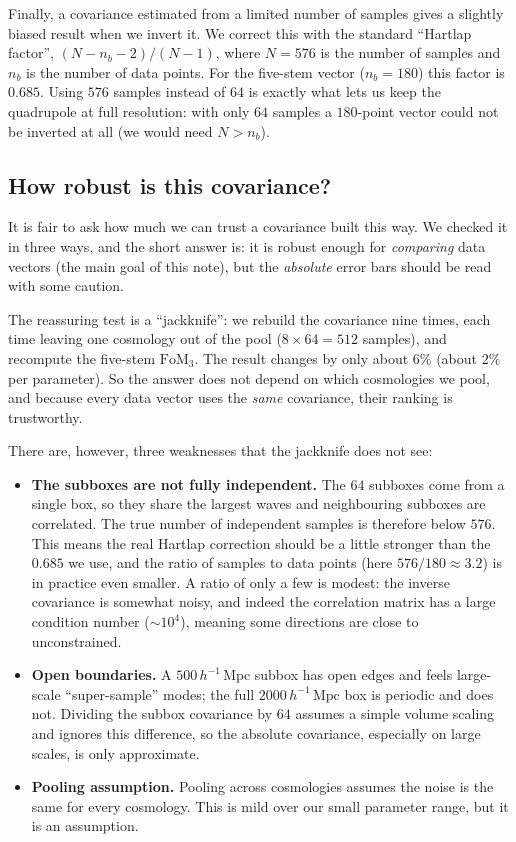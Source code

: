 \documentclass[11pt]{article}
\newcommand{\Mpch}{\,h^{-1}\,\mathrm{Mpc}}
\newcommand{\FoM}{\mathrm{FoM}}
\begin{document}
Finally, a covariance estimated from a limited number of samples gives a slightly
biased result when we invert it.  We correct this with the standard ``Hartlap
factor'', $(N-n_b-2)/(N-1)$, where $N=576$ is the number of samples and $n_b$ is
the number of data points.  For the five-stem vector ($n_b=180$) this factor is
$0.685$.  Using $576$ samples instead of $64$ is exactly what lets us keep the
quadrupole at full resolution: with only $64$ samples a $180$-point vector could
not be inverted at all (we would need $N>n_b$).

\subsection*{How robust is this covariance?}
\label{sec:covrobust}

It is fair to ask how much we can trust a covariance built this way.  We checked
it in three ways, and the short answer is: it is robust enough for
\emph{comparing} data vectors (the main goal of this note), but the
\emph{absolute} error bars should be read with some caution.

The reassuring test is a ``jackknife'': we rebuild the covariance nine times,
each time leaving one cosmology out of the pool ($8\times64 = 512$ samples), and
recompute the five-stem $\FoM_3$.  The result changes by only about $6\%$ (about
$2\%$ per parameter).  So the answer does not depend on which cosmologies we pool,
and because every data vector uses the \emph{same} covariance, their ranking is
trustworthy.

There are, however, three weaknesses that the jackknife does not see:
\begin{itemize}
\item \textbf{The subboxes are not fully independent.}  The $64$ subboxes come
  from a single box, so they share the largest waves and neighbouring subboxes
  are correlated.  The true number of independent samples is therefore below
  $576$.  This means the real Hartlap correction should be a little stronger than
  the $0.685$ we use, and the ratio of samples to data points (here $576/180
  \approx 3.2$) is in practice even smaller.  A ratio of only a few is modest:
  the inverse covariance is somewhat noisy, and indeed the correlation matrix has
  a large condition number ($\sim\!10^4$), meaning some directions are close to
  unconstrained.
\item \textbf{Open boundaries.}  A $500\Mpch$ subbox has open edges and feels
  large-scale ``super-sample'' modes; the full $2000\Mpch$ box is periodic and
  does not.  Dividing the subbox covariance by $64$ assumes a simple volume
  scaling and ignores this difference, so the absolute covariance, especially on
  large scales, is only approximate.
\item \textbf{Pooling assumption.}  Pooling across cosmologies assumes the noise
  is the same for every cosmology.  This is mild over our small parameter range,
  but it is an assumption.
\end{itemize}
\end{document}
